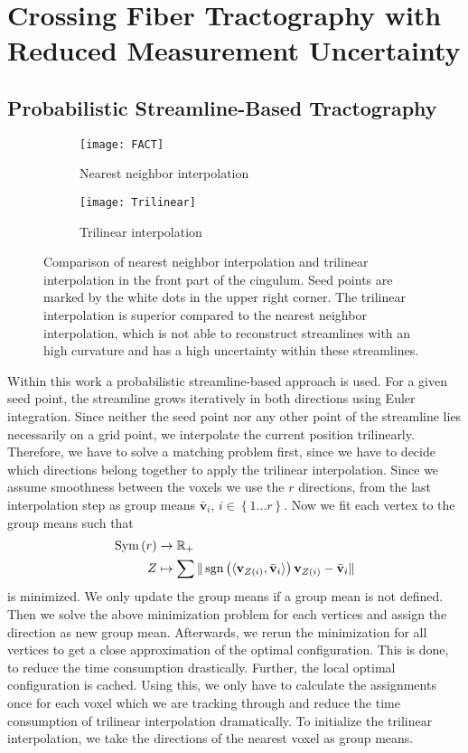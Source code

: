 \section{Crossing Fiber Tractography with Reduced Measurement Uncertainty}

\subsection{Probabilistic Streamline-Based Tractography}
\begin{figure}[h]
	\centering
	\begin{subfigure}[b]{0.45\linewidth}
		\texttt{[image: FACT]}
		\caption{Nearest neighbor interpolation}
	\end{subfigure}
	\begin{subfigure}[b]{0.45\linewidth}
		\texttt{[image: Trilinear]}
		\caption{Trilinear interpolation}
	\end{subfigure}
	\caption{Comparison of nearest neighbor interpolation and trilinear
	interpolation in the front part of the cingulum. Seed points are marked
	by the white dots in the upper right corner. The trilinear interpolation
is superior compared to the nearest neighbor interpolation, which is not able to
reconstruct streamlines with an high curvature and has a high uncertainty within
these streamlines.}

	\label{fig:interpolation-comparison}
\end{figure}
Within this work a probabilistic streamline-based approach is used. For a given
seed point, the streamline grows iteratively in both directions using Euler
integration. Since neither the seed point nor any other point of the streamline
lies necessarily on a grid point, we interpolate the current position trilinearly. Therefore,
we have to solve a matching problem first, since we have to decide which
directions belong together to apply the trilinear interpolation. Since we assume
smoothness between the voxels we use the $r$ directions, from the last
interpolation step as group means $\bar{\mathbf{v}}_i$, $i \in \left\{ 1\dots r 
\right\}$. Now we fit each vertex to the group means such
that 
\begin{align}
	\text{Sym} \left( r  \right) & \rightarrow \mathbb{R}_+ \\ 
	Z & \mapsto \sum \| \operatorname*{sgn} \left( \langle \mathbf{v}_{Z \left( i \right)}
	, \bar{\mathbf{v}}_i \rangle  \right) \mathbf{v}_{Z \left( i \right)} -
\bar{\mathbf{v}}_i
	\|
\end{align}
is minimized. We only update the group means if a group mean is not defined.
Then we solve the above minimization problem for each vertices and assign the direction as new
group mean. Afterwards, we rerun the minimization for all vertices to get a
close approximation of the optimal configuration. This is done,
to reduce the time consumption drastically. Further, the local optimal
configuration is cached. Using this, we only have to calculate the assignments
once for each voxel which we are tracking through and reduce the time
consumption of trilinear interpolation dramatically. 
To initialize the trilinear interpolation, we take the directions of the nearest voxel as group means.

